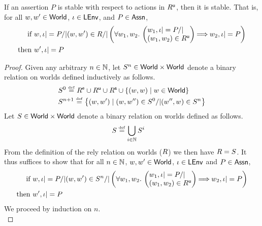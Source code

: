 \begin{lemma}[Stability]
If an assertion $P$ is stable with respect to actions in $R^{\textsf{u}}$, then it is stable. That is, for all $w, w' \in \textsf{World}$, $\iota \in \textsf{LEnv}$, and $P \in \textsf{Assn}$,
%
\begin{align*}
	\text{if } & w, \lenv |= P /| (w, w') \in \rely /| 
		\left(
		\begin{array}{@{} l @{}}
			\for{w_1, w_2} 
			\left(
			\begin{array}{@{} l @{}}
				w_1, \lenv |= P /|\\
			 (w_1, w_2) \in \updateR  
			\end{array}
			\right)
			\!\!\implies \!\!
			w_2, \lenv |= P 
		\end{array}
		\right)\\
	\text{then } & w', \lenv |= P
\end{align*}
%
\begin{proof}
Given any arbitrary $n \in \mathbb{N}$, let $S^{n} \in \textsf{World} \times \textsf{World}$ denote a binary relation on worlds defined inductively as follows.
%
\begin{align*}
	& S^{0} \mathrel{\stackrel{\smash{\scriptscriptstyle{\mathrm{def}}}}{=}} R^{\textsf{e}} \cup R^{\textsf{u}} \cup R^{\textsf{s}} \cup \left\{(w, w) \mid w \in \textsf{World} \right\} \\
	& S^{n+1} \mathrel{\stackrel{\smash{\scriptscriptstyle{\mathrm{def}}}}{=}} \left\{ (w, w') \mid (w, w'') \in S^{0} /| (w'', w) \in S^{n} \right\}
\end{align*}
%
Let $S \in \textsf{World} \times \textsf{World}$ denote a binary relation on worlds defined as follows. 
%
\begin{align*}
	& S \mathrel{\stackrel{\smash{\scriptscriptstyle{\mathrm{def}}}}{=}} \bigcup\limits_{i \in \mathbb{N}} S^{i}
\end{align*}
% 
From the definition of the rely relation on worlds ($R$) we then have $R = S$. It thus suffices to show that for all $n \in \mathbb{N}$, $w, w' \in \textsf{World}$, $\iota \in \textsf{LEnv}$ and $P \in \textsf{Assn}$, 
%
\begin{align*}
	\text{if } & w, \lenv |= P /| (w, w') \in S^{n} /| 
	\left(
		\begin{array}{@{} l @{}}
			\for{w_1, w_2} 
			\left(
			\begin{array}{@{} l @{}}
				w_1, \lenv |= P /|\\
			 (w_1, w_2) \in \updateR  
			\end{array}
			\right)
			\!\!\implies \!\!
			w_2, \lenv |= P 
		\end{array}
		\right)\\
	\text{then } & w', \lenv |= P
\end{align*}
%
We proceed by induction on $n$. \\


\end{proof}
\end{lemma}
